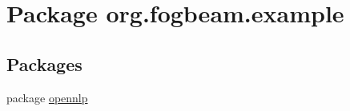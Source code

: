 \hypertarget{namespaceorg_1_1fogbeam_1_1example}{}\section{Package org.\+fogbeam.\+example}
\label{namespaceorg_1_1fogbeam_1_1example}
\subsection*{Packages}
\begin{DoxyCompactItemize}
\item 
package \hyperlink{namespaceorg_1_1fogbeam_1_1example_1_1opennlp}{opennlp}
\end{DoxyCompactItemize}

